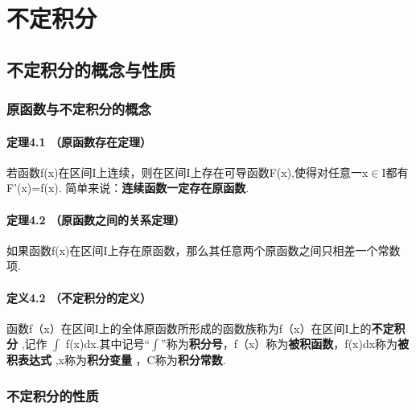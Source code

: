 \documentclass[12pt, a4paper, oneside]{ctexart}
\begin{document}
\section{不定积分}
\vskip 2cm
\subsection{不定积分的概念与性质}
\vskip 1cm
\subsubsection{原函数与不定积分的概念}
\paragraph{定理4.1 （原函数存在定理）} 若函数f(x)在区间I上连续，则在区间I上存在可导函数F(x),使得对任意一x$ \in $I都有F'(x)=f(x).
\newline
简单来说：\textbf{连续函数一定存在原函数}.

\paragraph{定理4.2 （原函数之间的关系定理）} 如果函数f(x)在区间I上存在原函数，那么其任意两个原函数之间只相差一个常数项.

\paragraph{定义4.2 （不定积分的定义）} 函数f（x）在区间I上的全体原函数所形成的函数族称为f（x）在区间I上的\textbf{不定积分} ,记作 $\int $ f(x)dx.其中记号“$\int $”称为\textbf{积分号}，f（x）称为\textbf{被积函数}，f(x)dx称为\textbf{被积表达式} ,x称为\textbf{积分变量} ，C称为\textbf{积分常数}.

\vskip 2cm
\subsubsection{不定积分的性质}
\vskip 1cm
\end{document}
